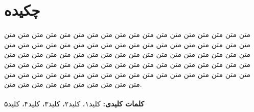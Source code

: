 \chapter*{چکیده}
\begin{spacing}{2}
متن متن متن متن متن متن متن متن متن متن متن متن متن متن متن متن متن متن متن متن متن متن متن متن متن متن متن متن متن متن متن متن متن متن متن متن متن متن متن متن متن متن متن متن متن متن متن متن متن متن متن متن متن متن متن متن متن متن متن متن متن متن متن متن متن متن متن متن متن متن متن متن متن متن متن متن متن متن متن متن متن متن متن متن متن متن متن متن متن متن متن متن متن متن متن متن متن متن متن متن.
\\\\
\textbf{کلمات کلیدی:}
کلید۱، کلید۲، کلید۳، کلید۴، کلید۵
\end{spacing}
